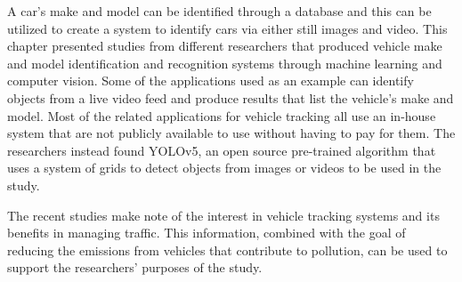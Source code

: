 	A car’s make and model can be identified through a database and this can be utilized to create a system to identify cars via either still images and video. This chapter presented studies from different researchers that produced vehicle make and model identification and recognition systems through machine learning and computer vision. Some of the applications used as an example can identify objects from a live video feed and produce results that list the vehicle’s make and model. Most of the related applications for vehicle tracking all use an in-house system that are  not publicly available to use without having to pay for them. The researchers instead found YOLOv5, an open source pre-trained algorithm that uses a system of grids to detect objects from images or videos to be used in the study.

	The recent studies make note of the interest in vehicle tracking systems and its benefits in managing traffic. This information, combined with the goal of reducing the emissions from vehicles that contribute to pollution, can be used to support the researchers’ purposes of the study.



